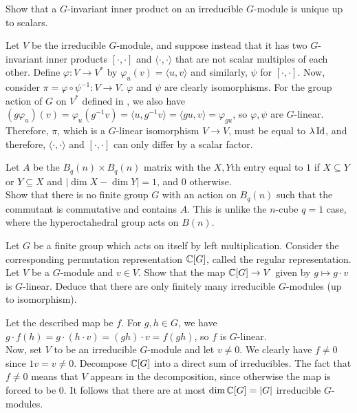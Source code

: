 \documentclass{article}
\begin{document}
	\begin{problem}
		Show that a $G$-invariant inner product on an irreducible $G$-module is unique up to scalars.
	\end{problem}
	\begin{solution*}
		Let $V$ be the irreducible $G$-module, and suppose instead that it has two $G$-invariant inner products $[\cdot,\cdot]$ and $\langle \cdot,\cdot\rangle$ that are not scalar multiples of each other. Define $\varphi : V \to V^*$ by $\varphi_u(v) = \langle u,v\rangle$ and similarly, $\psi$ for $[\cdot,\cdot]$. Now, consider $\pi = \varphi \circ \psi^{-1} : V \to V$. $\varphi$ and $\psi$ are clearly isomorphisms. For the group action of $G$ on $V^*$ defined in , we also have $(g \varphi_u)(v) = \varphi_u(g^{-1}v) = \langle u,g^{-1}v\rangle = \langle gu,v\rangle = \varphi_{gu}$, so $\varphi,\psi$ are $G$-linear. Therefore, $\pi$, which is a $G$-linear isomorphism $V \to V$, must be equal to $\lambda \operatorname{Id}$, and therefore, $\langle \cdot,\cdot\rangle$ and $[\cdot,\cdot]$ can only differ by a scalar factor.  
	\end{solution*}

	\begin{problem}
		Let $A$ be the $B_q(n) \times B_q(n)$ matrix with the $X,Y$th entry equal to $1$ if $X \subseteq Y$ or $Y \subseteq X$ and $|\dim X - \dim Y| = 1$, and $0$ otherwise.\\
		Show that there is no finite group $G$ with an action on $B_q(n)$ such that the commutant is commutative and contains $A$. This is unlike the $n$-cube $q=1$ case, where the hyperoctahedral group acts on $B(n)$.
	\end{problem}
	\begin{solution*}
		
	\end{solution*}

	\begin{problem}
		Let $G$ be a finite group which acts on itself by left multiplication. Consider the corresponding permutation representation $\mathbb{C}[G]$, called the regular representation. Let $V$ be a $G$-module and $v \in V$. Show that the map $\mathbb{C}[G] \to V$ given by $g \mapsto g\cdot v$ is $G$-linear. Deduce that there are only finitely many irreducible $G$-modules (up to isomorphism).
	\end{problem}
	\begin{solution*}
		Let the described map be $f$. For $g,h \in G$, we have $g \cdot f(h) = g \cdot (h \cdot v) = (gh) \cdot v = f(gh)$, so $f$ is $G$-linear.\\
		Now, set $V$ to be an irreducible $G$-module and let $v \ne 0$. We clearly have $f \ne 0$ since $1v = v \ne 0$. Decompose $\mathbb{C}[G]$ into a direct sum of irreducibles. The fact that $f \ne 0$ means that $V$ appears in the decomposition, since otherwise the map is forced to be $0$. It follows that there are at most $\dim \mathbb{C}[G] = |G|$ irreducible $G$-modules. 
	\end{solution*}
\end{document}
